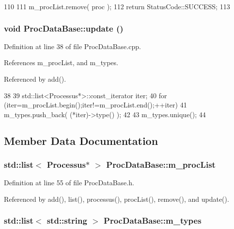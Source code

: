 \begin{DoxyCode}
110                                                   {
111   m_procList.remove( proc );
112   return StatusCode::SUCCESS;
113 }
\end{DoxyCode}
\hypertarget{classProcDataBase_a604959db08c3871d863a799cc4e1d5f4}{
\subsubsection[{update}]{\setlength{\rightskip}{0pt plus 5cm}void ProcDataBase::update ()}}
\label{classProcDataBase_a604959db08c3871d863a799cc4e1d5f4}


Definition at line 38 of file ProcDataBase.cpp.

References m\_\-procList, and m\_\-types.

Referenced by add().


\begin{DoxyCode}
38                             {
39   std::list<Processus*>::const_iterator iter;
40   for (iter=m_procList.begin();iter!=m_procList.end();++iter){
41     m_types.push_back( (*iter)->type() );
42   }
43   m_types.unique();
44 }
\end{DoxyCode}


\subsection{Member Data Documentation}
\hypertarget{classProcDataBase_a9b7458b811b826c5d264b436c7a391c4}{
\subsubsection[{m\_\-procList}]{\setlength{\rightskip}{0pt plus 5cm}std::list$<$ {\bf Processus}$\ast$ $>$ {\bf ProcDataBase::m\_\-procList}}}
\label{classProcDataBase_a9b7458b811b826c5d264b436c7a391c4}


Definition at line 55 of file ProcDataBase.h.

Referenced by add(), list(), processus(), procList(), remove(), and update().\hypertarget{classProcDataBase_a94063cebf50be9a12b8bd9f70e410ed5}{
\subsubsection[{m\_\-types}]{\setlength{\rightskip}{0pt plus 5cm}std::list$<$ std::string $>$ {\bf ProcDataBase::m\_\-types}}}
\label{classProcDataBase_a94063cebf50be9a12b8bd9f70e410ed5}


